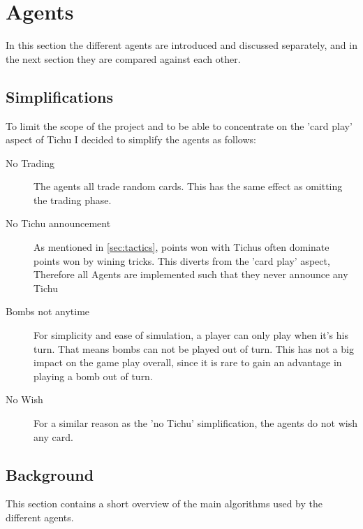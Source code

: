 \chapter{Agents}
In this section the different agents are introduced and discussed separately, and in the next section they are compared against each other.

\section*{Simplifications}
To limit the scope of the project and to be able to concentrate on the 'card play' aspect of Tichu I decided to simplify the agents as follows:
\begin{description}
    \item[No Trading] The agents all trade random cards. This has the same effect as omitting the trading phase. %
    \item[No Tichu announcement] As mentioned in \ref{sec:tactics}, points won with Tichus often dominate points won by wining tricks. This diverts from the 'card play' aspect, Therefore all Agents are implemented such that they never announce any Tichu %
    \item[Bombs not anytime] For simplicity and ease of simulation, a player can only play when it's his turn. That means bombs can not be played out of turn. This has not a big impact on the game play overall, since it is rare to gain an advantage in playing a bomb out of turn.
    \item[No Wish] For a similar reason as the 'no Tichu' simplification, the agents do not wish any card. %
\end{description}

\section{Background}
\label{sec:background}
This section contains a short overview of the main algorithms used by the different agents.

